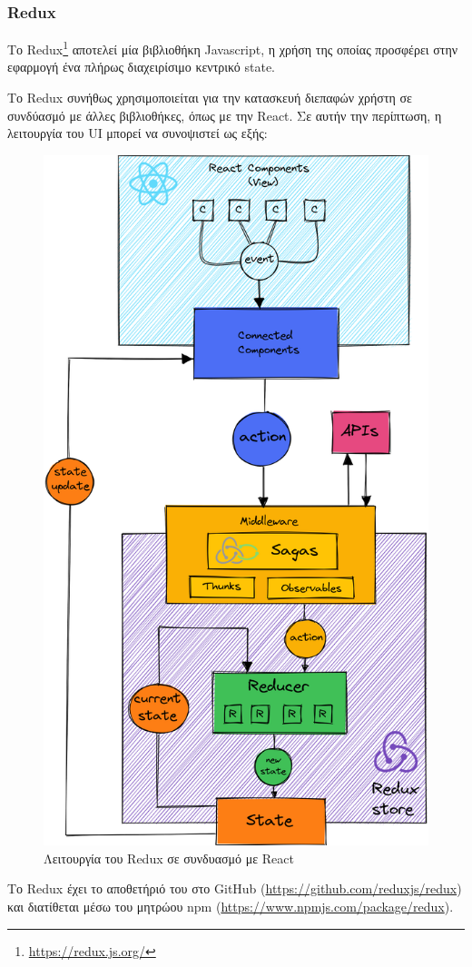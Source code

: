 \subsubsection{Redux} \label{subsection:4-3-2-1-redux}


Το Redux\footnote{\url{https://redux.js.org/}} αποτελεί μία βιβλιοθήκη Javascript, η χρήση της οποίας προσφέρει στην εφαρμογή ένα πλήρως διαχειρίσιμο κεντρικό state. 


Το Redux συνήθως χρησιμοποιείται για την κατασκευή διεπαφών χρήστη σε συνδύασμό με άλλες βιβλιοθήκες, όπως με την React. Σε αυτήν την περίπτωση, η λειτουργία του UI μπορεί να συνοψιστεί ως εξής:

\begin{figure}[H]
	\centering
	\includegraphics[width=.75\textwidth]{assets/figures/chapter-4/4.3.react-redux}
	\caption{Λειτουργία του Redux σε συνδυασμό με React}
\end{figure}

Το Redux έχει το αποθετήριό του στο GitHub (\url{https://github.com/reduxjs/redux}) και διατίθεται μέσω του μητρώου npm (\url{https://www.npmjs.com/package/redux}).
